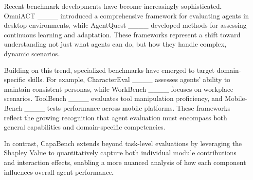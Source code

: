 Recent benchmark developments have become increasingly sophisticated. OmniACT ____ introduced a comprehensive framework for evaluating agents in desktop environments, while AgentQuest ____ developed methods for assessing continuous learning and adaptation. These frameworks represent a shift toward understanding not just what agents can do, but how they handle complex, dynamic scenarios.

Building on this trend, specialized benchmarks have emerged to target domain-specific skills. For example, CharacterEval ____ assesses agents' ability to maintain consistent personas, while WorkBench ____ focuses on workplace scenarios. ToolBench ____ evaluates tool manipulation proficiency, and Mobile-Bench ____ tests performance across mobile platforms. These frameworks reflect the growing recognition that agent evaluation must encompass both general capabilities and domain-specific competencies.

In contrast, CapaBench extends beyond task-level evaluations by leveraging the Shapley Value to quantitatively capture both individual module contributions and interaction effects, enabling a more nuanced analysis of how each component influences overall agent performance.